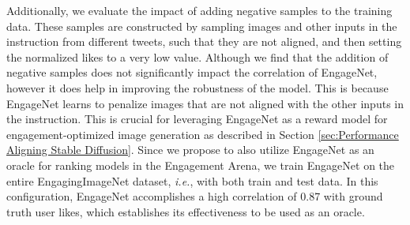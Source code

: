  
Additionally, we evaluate the impact of adding negative samples to the training data. These samples are constructed by sampling images and other inputs in the instruction from different tweets, such that they are not aligned, and then setting the normalized likes to a very low value. Although we find that the addition of negative samples does not significantly impact the correlation of EngageNet, however it does help in improving the robustness of the model. This is because EngageNet learns to penalize images that are not aligned with the other inputs in the instruction. This is crucial for leveraging EngageNet as a reward model for engagement-optimized image generation as described in Section \ref{sec:Performance Aligning Stable Diffusion}. Since we propose to also utilize EngageNet as an oracle for ranking models in the Engagement Arena, we train EngageNet on the entire EngagingImageNet dataset, \textit{i.e.}, with both train and test data. In this configuration, EngageNet accomplishes a high correlation of 0.87 with ground truth user likes, which establishes its effectiveness to be used as an oracle. 
 


 
 

 
